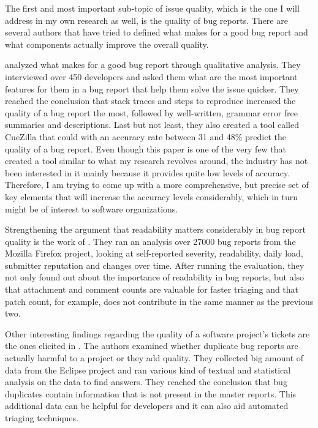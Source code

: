 \documentclass[11pt,english,twocolumn]{article}
\begin{document}
The first and most important sub-topic of issue quality, which is the one
I will address in my own research as well, is the quality of bug reports.
There are several authors that have tried to defined what makes for a good bug
report and what components actually improve the overall quality.

\cite{bettenburg2008makes} analyzed what 
makes for a good bug report through qualitative analysis. They interviewed over
450 developers and asked them what are the most important features for them in
a bug report that help them solve the issue quicker. They reached the conclusion 
that stack traces and steps to reproduce increased the quality of a bug report 
the most, followed by well-written, grammar error free summaries and 
descriptions. Last but not least, they also created a tool called CueZilla that 
could with an accuracy rate between 31 and 48\% predict the quality of a bug 
report. Even though this paper is one of the very few that created a tool
similar to what my research revolves around, the industry has not been interested
in it mainly because it provides quite low levels of accuracy. Therefore, I am trying
to come up with a more comprehensive, but precise set of key elements that will increase the accuracy
levels considerably, which in turn might be of interest to software organizations.

Strengthening the argument that readability matters considerably in bug report 
quality is the work of \cite{hooimeijer2007modeling}. They ran an analysis over
27000 bug reports from the Mozilla Firefox project, looking at self-reported 
severity, readability, daily load, submitter reputation and changes over time. 
After running the evaluation, they not only found out about the importance of
readability in bug reports, but also that attachment and comment counts are 
valuable for faster triaging and that patch count, for example, does not
contribute in the same manner as the previous two.

Other interesting findings regarding the quality of a software project's tickets
are the ones elicited in \cite{bettenburg2008duplicate}. The authors examined
whether duplicate bug reports are actually harmful to a project or they add 
quality. They collected big amount of data from the Eclipse project and ran
various kind of textual and statistical analysis on the data to find answers.
They reached the conclusion that bug duplicates contain information that is not
present in the master reports. This additional data can be helpful for developers
and it can also aid automated triaging techniques.
\end{document}
